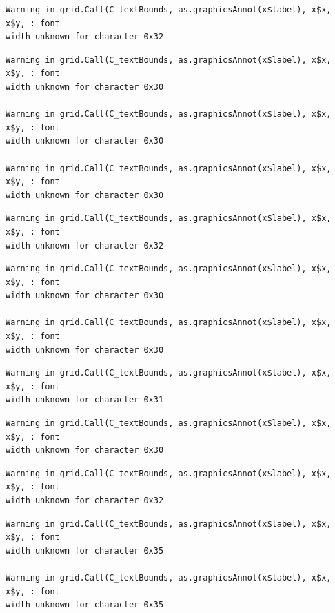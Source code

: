 \documentclass[
  letterpaper,
  DIV=11,
  numbers=noendperiod]{scrreprt}
\begin{document}
\begin{verbatim}
Warning in grid.Call(C_textBounds, as.graphicsAnnot(x$label), x$x, x$y, : font
width unknown for character 0x32
\end{verbatim}

\begin{verbatim}
Warning in grid.Call(C_textBounds, as.graphicsAnnot(x$label), x$x, x$y, : font
width unknown for character 0x30

Warning in grid.Call(C_textBounds, as.graphicsAnnot(x$label), x$x, x$y, : font
width unknown for character 0x30

Warning in grid.Call(C_textBounds, as.graphicsAnnot(x$label), x$x, x$y, : font
width unknown for character 0x30
\end{verbatim}

\begin{verbatim}
Warning in grid.Call(C_textBounds, as.graphicsAnnot(x$label), x$x, x$y, : font
width unknown for character 0x32
\end{verbatim}

\begin{verbatim}
Warning in grid.Call(C_textBounds, as.graphicsAnnot(x$label), x$x, x$y, : font
width unknown for character 0x30

Warning in grid.Call(C_textBounds, as.graphicsAnnot(x$label), x$x, x$y, : font
width unknown for character 0x30
\end{verbatim}

\begin{verbatim}
Warning in grid.Call(C_textBounds, as.graphicsAnnot(x$label), x$x, x$y, : font
width unknown for character 0x31
\end{verbatim}

\begin{verbatim}
Warning in grid.Call(C_textBounds, as.graphicsAnnot(x$label), x$x, x$y, : font
width unknown for character 0x30
\end{verbatim}

\begin{verbatim}
Warning in grid.Call(C_textBounds, as.graphicsAnnot(x$label), x$x, x$y, : font
width unknown for character 0x32
\end{verbatim}

\begin{verbatim}
Warning in grid.Call(C_textBounds, as.graphicsAnnot(x$label), x$x, x$y, : font
width unknown for character 0x35

Warning in grid.Call(C_textBounds, as.graphicsAnnot(x$label), x$x, x$y, : font
width unknown for character 0x35
\end{verbatim}
\end{document}
